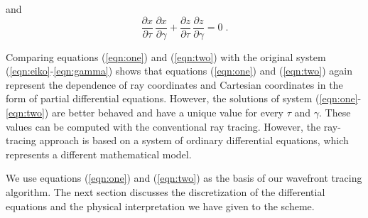 and
\begin{equation}
  {\frac{\partial x}{\partial \tau}\,\frac{\partial x}{\partial \gamma}}  +
  {\frac{\partial z}{\partial \tau}\,\frac{\partial z}{\partial \gamma}} = 0\;.
  \label{eqn:two}
\end{equation}
\par
Comparing equations (\ref{eqn:one}) and (\ref{eqn:two}) with the original
system (\ref{eqn:eiko}-\ref{eqn:gamma}) shows that equations (\ref{eqn:one})
and (\ref{eqn:two}) again represent the dependence of ray coordinates and
Cartesian coordinates in the form of partial differential equations. 
However, the solutions of system (\ref{eqn:one}-\ref{eqn:two}) are better
behaved and have a unique value for every $\tau$ and $\gamma$.  These values
can be computed with the conventional ray tracing. However, the ray-tracing
approach is based on a system of ordinary differential equations, which
represents a different mathematical model.
\par
We use equations (\ref{eqn:one}) and (\ref{eqn:two}) as the basis of our
wavefront tracing algorithm. The next section discusses the discretization of
the differential equations and the physical interpretation we have given to
the scheme.

